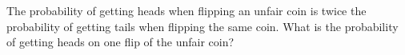 The probability of getting heads when flipping an unfair coin is twice the probability of getting tails when flipping the same coin. What is the probability of getting heads on one flip of the unfair coin?
